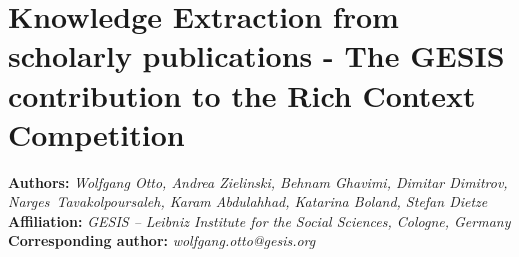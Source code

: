 \documentclass[fleqn]{template}
\begin{document}
    \section{Knowledge Extraction from scholarly publications - The GESIS contribution to the Rich Context Competition}
    \textbf{Authors:}
    \emph{Wolfgang Otto, Andrea Zielinski,
         Behnam Ghavimi,
         Dimitar Dimitrov,
         Narges~Tavakolpoursaleh,
         Karam Abdulahhad,
         Katarina Boland,
         Stefan Dietze
        }\\
    \textbf{Affiliation:}
    \emph{GESIS -- Leibniz Institute for the Social Sciences, Cologne, Germany}\\
    \textbf{Corresponding author:}
    \emph{wolfgang.otto@gesis.org} %

    
    
    
    
    
    
    
    
    
    
\end{document}

